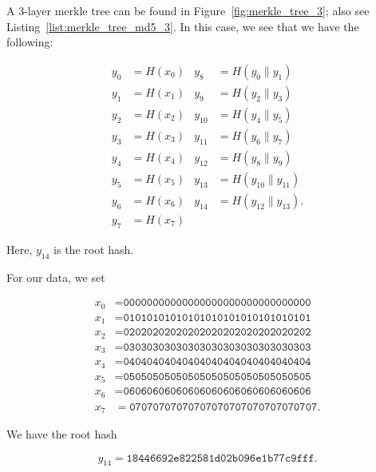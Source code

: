 \begin{example}

A 3-layer \gls{merkle tree} can be found in Figure~\ref{fig:merkle_tree_3};
also see Listing~\ref{list:merkle_tree_md5_3}.
In this case, we see that we have the following:




\begin{align}
    y_{0}  &= H(x_{0})
        &
    y_{8}  &= H(y_{0}\|y_{1}) \nonumber\\
    y_{1}  &= H(x_{1})
        &
    y_{9}  &= H(y_{2}\|y_{3}) \nonumber\\
    y_{2}  &= H(x_{2})
        &
    y_{10} &= H(y_{4}\|y_{5}) \nonumber\\
    y_{3}  &= H(x_{3})
        &
    y_{11} &= H(y_{6}\|y_{7}) \nonumber\\
    y_{4}  &= H(x_{4})
        &
    y_{12} &= H(y_{8}\|y_{9}) \nonumber\\
    y_{5}  &= H(x_{5})
        &
    y_{13} &= H(y_{10}\|y_{11}) \nonumber\\
    y_{6}  &= H(x_{6})
        &
    y_{14} &= H(y_{12}\|y_{13}). \nonumber\\
    y_{7}  &= H(x_{7})
    \label{eq:merkle_tree_3_def}
\end{align}

\noindent
Here, $y_{14}$ is the root hash.

For our data, we set

\begin{align}
    x_{0} &= \texttt{00000000000000000000000000000000}
        \nonumber\\
    x_{1} &= \texttt{01010101010101010101010101010101}
        \nonumber\\
    x_{2} &= \texttt{02020202020202020202020202020202}
        \nonumber\\
    x_{3} &= \texttt{03030303030303030303030303030303}
        \nonumber\\
    x_{4} &= \texttt{04040404040404040404040404040404}
        \nonumber\\
    x_{5} &= \texttt{05050505050505050505050505050505}
        \nonumber\\
    x_{6} &= \texttt{06060606060606060606060606060606}
        \nonumber\\
    x_{7} &= \texttt{07070707070707070707070707070707}.
    \label{eq:merkle_tree_3_data}
\end{align}

\noindent
We have the root hash

\begin{equation}
    y_{14} = \texttt{18446692e822581d02b096e1b77c9fff}.
    \label{eq:merkle_tree_3_root_hash}
\end{equation}
\end{example}

